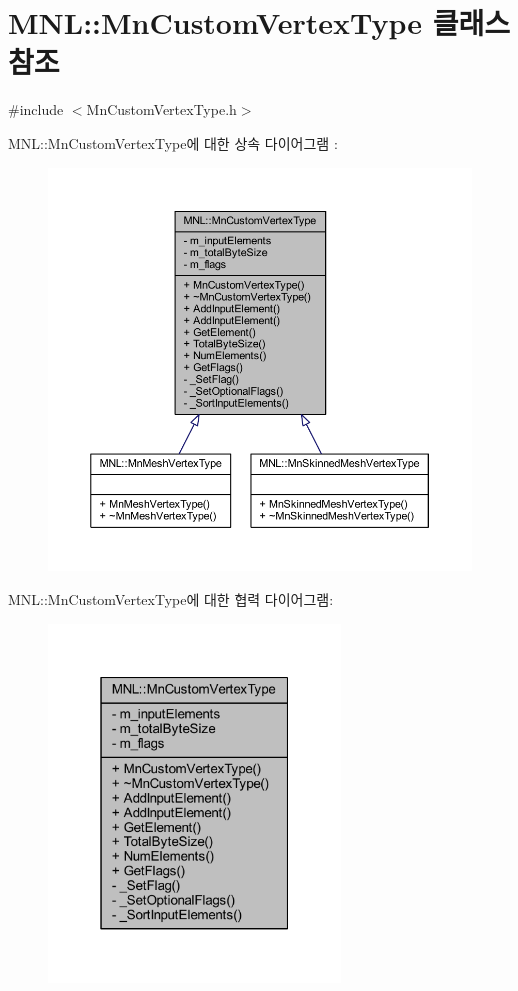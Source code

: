 \hypertarget{class_m_n_l_1_1_mn_custom_vertex_type}{}\section{M\+NL\+:\+:Mn\+Custom\+Vertex\+Type 클래스 참조}
\label{class_m_n_l_1_1_mn_custom_vertex_type}


{\ttfamily \#include $<$Mn\+Custom\+Vertex\+Type.\+h$>$}



M\+NL\+:\+:Mn\+Custom\+Vertex\+Type에 대한 상속 다이어그램 \+: \nopagebreak
\begin{figure}[H]
\begin{center}
\leavevmode
\includegraphics[width=350pt]{class_m_n_l_1_1_mn_custom_vertex_type__inherit__graph}
\end{center}
\end{figure}


M\+NL\+:\+:Mn\+Custom\+Vertex\+Type에 대한 협력 다이어그램\+:\nopagebreak
\begin{figure}[H]
\begin{center}
\leavevmode
\includegraphics[width=220pt]{class_m_n_l_1_1_mn_custom_vertex_type__coll__graph}
\end{center}
\end{figure}
